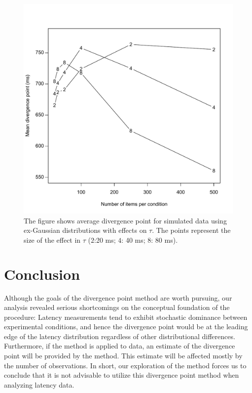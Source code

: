 \documentclass[man]{apa}%
\begin{document}
      
          
\begin{figure}[h] %
	\includegraphics[width=5in]{Figure6.pdf}
	\caption{The figure shows average divergence point for simulated data using ex-Gaussian distributions with effects on $\tau$. The points represent the size of the effect in $\tau$ ($2$:20 ms; $4$: 40 ms; $8$: 80 ms).}
	\label{fig:tau-div}
\end{figure}


 
            
  
\section{Conclusion}

Although the goals of the divergence point method are worth pursuing, our analysis revealed serious shortcomings on the conceptual foundation of the procedure:  Latency measurements tend to exhibit stochastic dominance between experimental conditions, and hence the divergence point would be at the leading edge of the latency distribution regardless of other distributional differences.  Furthermore, if the method is applied to data, an estimate of the divergence point will be provided by the method. This estimate will be affected mostly by the number of observations.   In short, our exploration of the method forces us to conclude that it is not advisable to utilize this divergence point method when analyzing latency data.
\end{document}
